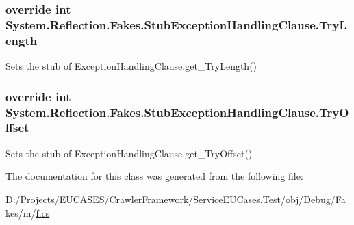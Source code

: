 \hypertarget{class_system_1_1_reflection_1_1_fakes_1_1_stub_exception_handling_clause_a8a6846bf128bb721f04bd00a191d248e}{
\subsubsection[{Try\-Length}]{\setlength{\rightskip}{0pt plus 5cm}override int System.\-Reflection.\-Fakes.\-Stub\-Exception\-Handling\-Clause.\-Try\-Length\hspace{0.3cm}{\ttfamily [get]}}}\label{class_system_1_1_reflection_1_1_fakes_1_1_stub_exception_handling_clause_a8a6846bf128bb721f04bd00a191d248e}


Sets the stub of Exception\-Handling\-Clause.\-get\-\_\-\-Try\-Length()

\hypertarget{class_system_1_1_reflection_1_1_fakes_1_1_stub_exception_handling_clause_a57f625f62cc0bb14a53035961d1fd72b}{
\subsubsection[{Try\-Offset}]{\setlength{\rightskip}{0pt plus 5cm}override int System.\-Reflection.\-Fakes.\-Stub\-Exception\-Handling\-Clause.\-Try\-Offset\hspace{0.3cm}{\ttfamily [get]}}}\label{class_system_1_1_reflection_1_1_fakes_1_1_stub_exception_handling_clause_a57f625f62cc0bb14a53035961d1fd72b}


Sets the stub of Exception\-Handling\-Clause.\-get\-\_\-\-Try\-Offset()



The documentation for this class was generated from the following file\-:\begin{DoxyCompactItemize}
\item 
D\-:/\-Projects/\-E\-U\-C\-A\-S\-E\-S/\-Crawler\-Framework/\-Service\-E\-U\-Cases.\-Test/obj/\-Debug/\-Fakes/m/\hyperlink{m_2f_8cs}{f.\-cs}\end{DoxyCompactItemize}

